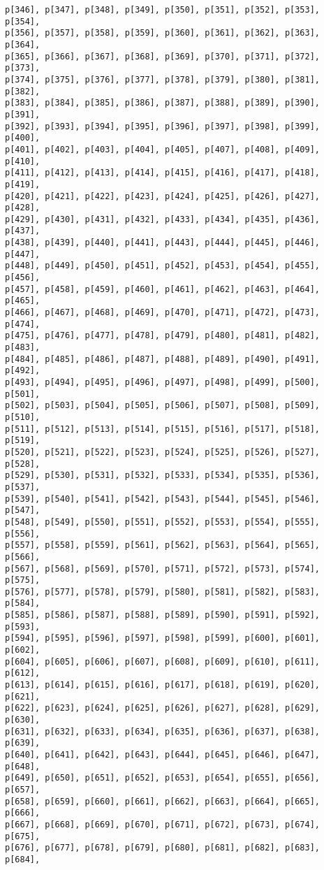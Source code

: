 \documentclass[
  letterpaper,
  DIV=11,
  numbers=noendperiod]{scrartcl}
\begin{document}
\begin{verbatim}
p[346], p[347], p[348], p[349], p[350], p[351], p[352], p[353], p[354],
p[356], p[357], p[358], p[359], p[360], p[361], p[362], p[363], p[364],
p[365], p[366], p[367], p[368], p[369], p[370], p[371], p[372], p[373],
p[374], p[375], p[376], p[377], p[378], p[379], p[380], p[381], p[382],
p[383], p[384], p[385], p[386], p[387], p[388], p[389], p[390], p[391],
p[392], p[393], p[394], p[395], p[396], p[397], p[398], p[399], p[400],
p[401], p[402], p[403], p[404], p[405], p[407], p[408], p[409], p[410],
p[411], p[412], p[413], p[414], p[415], p[416], p[417], p[418], p[419],
p[420], p[421], p[422], p[423], p[424], p[425], p[426], p[427], p[428],
p[429], p[430], p[431], p[432], p[433], p[434], p[435], p[436], p[437],
p[438], p[439], p[440], p[441], p[443], p[444], p[445], p[446], p[447],
p[448], p[449], p[450], p[451], p[452], p[453], p[454], p[455], p[456],
p[457], p[458], p[459], p[460], p[461], p[462], p[463], p[464], p[465],
p[466], p[467], p[468], p[469], p[470], p[471], p[472], p[473], p[474],
p[475], p[476], p[477], p[478], p[479], p[480], p[481], p[482], p[483],
p[484], p[485], p[486], p[487], p[488], p[489], p[490], p[491], p[492],
p[493], p[494], p[495], p[496], p[497], p[498], p[499], p[500], p[501],
p[502], p[503], p[504], p[505], p[506], p[507], p[508], p[509], p[510],
p[511], p[512], p[513], p[514], p[515], p[516], p[517], p[518], p[519],
p[520], p[521], p[522], p[523], p[524], p[525], p[526], p[527], p[528],
p[529], p[530], p[531], p[532], p[533], p[534], p[535], p[536], p[537],
p[539], p[540], p[541], p[542], p[543], p[544], p[545], p[546], p[547],
p[548], p[549], p[550], p[551], p[552], p[553], p[554], p[555], p[556],
p[557], p[558], p[559], p[561], p[562], p[563], p[564], p[565], p[566],
p[567], p[568], p[569], p[570], p[571], p[572], p[573], p[574], p[575],
p[576], p[577], p[578], p[579], p[580], p[581], p[582], p[583], p[584],
p[585], p[586], p[587], p[588], p[589], p[590], p[591], p[592], p[593],
p[594], p[595], p[596], p[597], p[598], p[599], p[600], p[601], p[602],
p[604], p[605], p[606], p[607], p[608], p[609], p[610], p[611], p[612],
p[613], p[614], p[615], p[616], p[617], p[618], p[619], p[620], p[621],
p[622], p[623], p[624], p[625], p[626], p[627], p[628], p[629], p[630],
p[631], p[632], p[633], p[634], p[635], p[636], p[637], p[638], p[639],
p[640], p[641], p[642], p[643], p[644], p[645], p[646], p[647], p[648],
p[649], p[650], p[651], p[652], p[653], p[654], p[655], p[656], p[657],
p[658], p[659], p[660], p[661], p[662], p[663], p[664], p[665], p[666],
p[667], p[668], p[669], p[670], p[671], p[672], p[673], p[674], p[675],
p[676], p[677], p[678], p[679], p[680], p[681], p[682], p[683], p[684],

\end{verbatim}
\end{document}
